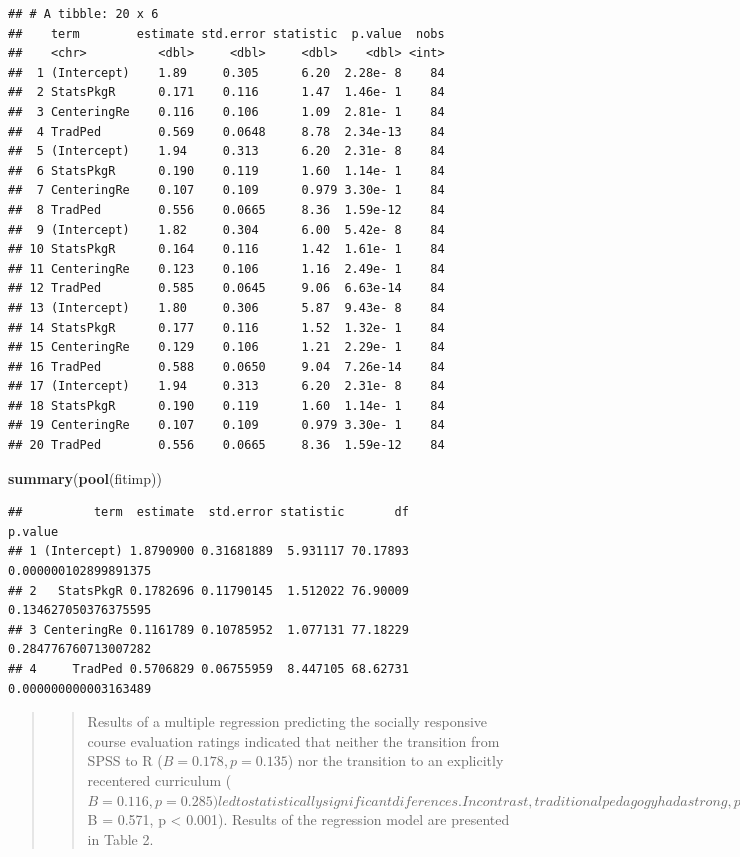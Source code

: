 \documentclass[
  11pt,
]{book}
\newenvironment{Shaded}{\begin{snugshade}}{\end{snugshade}}
\newcommand{\FunctionTok}[1]{\textcolor[rgb]{0.27,0.27,0.27}{\textbf{#1}}}
\newcommand{\NormalTok}[1]{#1}
\begin{document}
\begin{verbatim}
## # A tibble: 20 x 6
##    term        estimate std.error statistic  p.value  nobs
##    <chr>          <dbl>     <dbl>     <dbl>    <dbl> <int>
##  1 (Intercept)    1.89     0.305      6.20  2.28e- 8    84
##  2 StatsPkgR      0.171    0.116      1.47  1.46e- 1    84
##  3 CenteringRe    0.116    0.106      1.09  2.81e- 1    84
##  4 TradPed        0.569    0.0648     8.78  2.34e-13    84
##  5 (Intercept)    1.94     0.313      6.20  2.31e- 8    84
##  6 StatsPkgR      0.190    0.119      1.60  1.14e- 1    84
##  7 CenteringRe    0.107    0.109      0.979 3.30e- 1    84
##  8 TradPed        0.556    0.0665     8.36  1.59e-12    84
##  9 (Intercept)    1.82     0.304      6.00  5.42e- 8    84
## 10 StatsPkgR      0.164    0.116      1.42  1.61e- 1    84
## 11 CenteringRe    0.123    0.106      1.16  2.49e- 1    84
## 12 TradPed        0.585    0.0645     9.06  6.63e-14    84
## 13 (Intercept)    1.80     0.306      5.87  9.43e- 8    84
## 14 StatsPkgR      0.177    0.116      1.52  1.32e- 1    84
## 15 CenteringRe    0.129    0.106      1.21  2.29e- 1    84
## 16 TradPed        0.588    0.0650     9.04  7.26e-14    84
## 17 (Intercept)    1.94     0.313      6.20  2.31e- 8    84
## 18 StatsPkgR      0.190    0.119      1.60  1.14e- 1    84
## 19 CenteringRe    0.107    0.109      0.979 3.30e- 1    84
## 20 TradPed        0.556    0.0665     8.36  1.59e-12    84
\end{verbatim}

\begin{Shaded}
\begin{Highlighting}[]
\FunctionTok{summary}\NormalTok{(}\FunctionTok{pool}\NormalTok{(fitimp))}
\end{Highlighting}
\end{Shaded}

\begin{verbatim}
##          term  estimate  std.error statistic       df              p.value
## 1 (Intercept) 1.8790900 0.31681889  5.931117 70.17893 0.000000102899891375
## 2   StatsPkgR 0.1782696 0.11790145  1.512022 76.90009 0.134627050376375595
## 3 CenteringRe 0.1161789 0.10785952  1.077131 77.18229 0.284776760713007282
## 4     TradPed 0.5706829 0.06755959  8.447105 68.62731 0.000000000003163489
\end{verbatim}

\begin{quote}
\begin{quote}
Results of a multiple regression predicting the socially responsive course evaluation ratings indicated that neither the transition from SPSS to R (\(B = 0.178, p = 0.135\)) nor the transition to an explicitly recentered curriculum (\(B = 0.116, p = 0.285) led to statistically significant diferences. In contrast, traditional pedagogy had a strong, positive effect on evaluations of socially responsive pedagogy (\)B = 0.571, p \textless{} 0.001). Results of the regression model are presented in Table 2.
\end{quote}
\end{quote}
\end{document}
